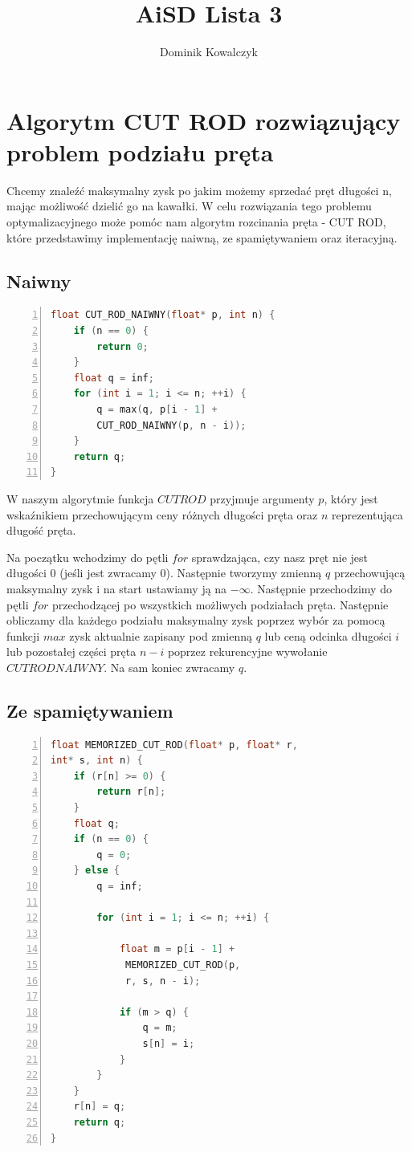 \documentclass{article}
\title{AiSD Lista 3}
\author{Dominik Kowalczyk}
\begin{document}
	\maketitle
	
\section{Algorytm CUT ROD rozwiązujący problem podziału pręta}

\large{Chcemy znaleźć maksymalny zysk po jakim możemy sprzedać pręt długości n, mając możliwość dzielić go na kawałki. W celu rozwiązania tego problemu optymalizacyjnego może pomóc nam algorytm rozcinania pręta - CUT ROD, które przedstawimy implementację naiwną, ze spamiętywaniem oraz iteracyjną.}

\subsection{Naiwny}

\begin{lstlisting}[language=C++, caption={Kod funkcji rozcinania pręta w wersji naiwnej}, numbers=left, frame=single, xleftmargin=20pt]
float CUT_ROD_NAIWNY(float* p, int n) {
	if (n == 0) {
		return 0;
	}
	float q = inf;
	for (int i = 1; i <= n; ++i) {
		q = max(q, p[i - 1] + 
		CUT_ROD_NAIWNY(p, n - i));
	}
	return q;
}
\end{lstlisting}

\large {W naszym algorytmie funkcja $CUT ROD$ przyjmuje argumenty $p$, który jest wskaźnikiem przechowującym ceny różnych długości pręta oraz $n$ reprezentująca długość pręta.}

\large{Na początku wchodzimy do pętli $for$ sprawdzająca, czy nasz pręt nie jest długości $0$ (jeśli jest zwracamy $0$). Następnie tworzymy zmienną $q$ przechowującą maksymalny zysk i na start ustawiamy ją na \(-\infty\). Następnie przechodzimy do pętli $for$ przechodzącej po wszystkich możliwych podziałach pręta. Następnie obliczamy dla każdego podziału maksymalny zysk poprzez wybór za pomocą funkcji $max$ zysk aktualnie zapisany pod zmienną $q$ lub ceną odcinka długości $i$ lub pozostałej części pręta $n - i$ poprzez rekurencyjne wywołanie $CUT ROD NAIWNY$. Na sam koniec zwracamy $q$.}

\subsection{Ze spamiętywaniem}

\begin{lstlisting}[language=C++, caption={Kod funkcji rozcinania pręta w wersji ze spamiętywaniem}, numbers=left, frame=single, xleftmargin=20pt]
float MEMORIZED_CUT_ROD(float* p, float* r, 
int* s, int n) {
	if (r[n] >= 0) {
		return r[n];
	}
	float q;
	if (n == 0) {
		q = 0;
	} else {
		q = inf;
		
		for (int i = 1; i <= n; ++i) {
			
			float m = p[i - 1] +
			 MEMORIZED_CUT_ROD(p, 
			 r, s, n - i);
			 
			if (m > q) {
				q = m;
				s[n] = i;
			}
		}
	}
	r[n] = q;
	return q;
}
\end{lstlisting}
\end{document}
